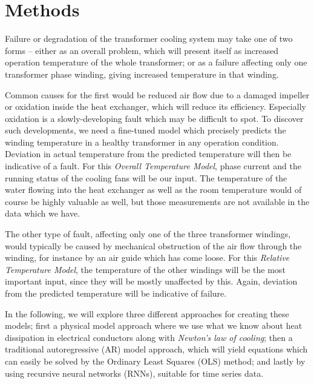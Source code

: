 \documentclass[]{article}
\begin{document}
\section{Methods} \label{sec:methods}

Failure or degradation of the transformer cooling system may take one of two forms -- either as an overall problem, which will present itself as increased operation temperature of the whole transformer; or as a failure affecting only one transformer phase winding, giving increased temperature in that winding. 

Common causes for the first would be reduced air flow due to a damaged impeller or oxidation inside the heat exchanger, which will reduce its efficiency. Especially oxidation is a slowly-developing fault which may be difficult to spot. To discover such developments, we need a fine-tuned model which precisely predicts the winding temperature in a healthy transformer in any operation condition. Deviation in actual temperature from the predicted temperature will then be indicative of a fault. For this \textit{Overall Temperature Model}, phase current and the running status of the cooling fans will be our input. The temperature of the water flowing into the heat exchanger as well as the room temperature would of course be highly valuable as well, but those measurements are not available in the data which we have.

The other type of fault, affecting only one of the three transformer windings, would typically be caused by mechanical obstruction of the air flow through the winding, for instance by an air guide which has come loose. For this \textit{Relative Temperature Model}, the temperature of the other windings will be the most important input, since they will be mostly unaffected by this. Again, deviation from the predicted temperature will be indicative of failure.

In the following, we will explore three different approaches for creating these models; first a physical model approach where we use what we know about heat dissipation in electrical conductors along with \textit{Newton's law of cooling}; then a traditional autoregressive (AR) model approach, which will yield equations which can easily be solved by the Ordinary Least Squares (OLS) method; and lastly by using recursive neural networks (RNNs), suitable for time series data.
\end{document}
